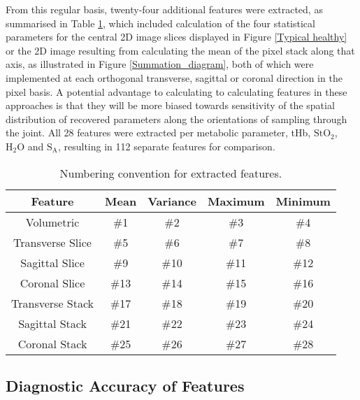 \documentclass[twoside]{bhamthesis}
\theoremstyle{definition}
\begin{document}
From this regular basis, twenty-four additional features were extracted, as summarised in Table \ref{tab:Numbering convention}, which included calculation of the four statistical parameters for the central 2D image slices displayed in Figure \ref{Typical healthy} or the 2D image resulting from calculating the mean of the pixel stack along that axis, as illustrated in Figure \ref{Summation_diagram}, both of which were implemented at each orthogonal transverse, sagittal or coronal direction in the pixel basis.  A potential advantage to calculating to calculating features in these approaches is that they will be more biased towards sensitivity of the spatial distribution of recovered parameters along the orientations of sampling through the joint.  All 28 features were extracted per metabolic parameter, tHb, $\mathrm{StO_2}$, $\mathrm{H_2O}$ and $\mathrm{S_A}$, resulting in 112 separate features for comparison.  

\begin{table}[!ht]
\caption{Numbering convention for extracted features.} 
\label{tab:Numbering convention}
\begin{center}       
\begin{tabular}{c c c c c }
\hline
\rule[-1ex]{0pt}{3.5ex}  Feature & Mean & Variance & Maximum & Minimum \\
\hline
\rule[-1ex]{0pt}{3.5ex}  Volumetric & \#1 & \#2 & \#3  &  \#4 \\
\rule[-1ex]{0pt}{3.5ex}  Transverse Slice & \#5 & \#6 & \#7  &  \#8 \\
\rule[-1ex]{0pt}{3.5ex}  Sagittal Slice & \#9 & \#10 & \#11  &  \#12 \\
\rule[-1ex]{0pt}{3.5ex}  Coronal Slice & \#13 & \#14 & \#15  &  \#16 \\
\rule[-1ex]{0pt}{3.5ex}  Transverse Stack & \#17 & \#18 & \#19  &  \#20 \\
\rule[-1ex]{0pt}{3.5ex}  Sagittal Stack & \#21 & \#22 & \#23  &  \#24 \\
\rule[-1ex]{0pt}{3.5ex}  Coronal Stack & \#25 & \#26 & \#27  &  \#28 \\
\hline
\end{tabular}
\end{center}
\end{table} 

\subsection{Diagnostic Accuracy of Features}
\end{document}
